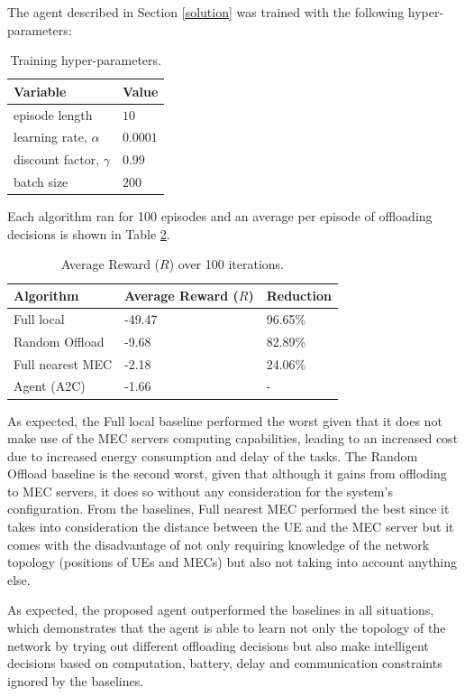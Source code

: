 The agent described in Section \ref{solution} was trained with the following hyper-parameters:

\begin{table}[H]
\centering
\begin{tabular}{|l|l|}
\hline
Variable & Value \\ \hline
episode length&$10$\\
learning rate, $\alpha$&$0.0001$\\
discount factor, $\gamma$&$0.99$\\
batch size&$200$\\ \hline
\end{tabular}
\caption{Training hyper-parameters.}\label{training_hyperparams}
\end{table}

Each algorithm ran for 100 episodes and an average per episode of offloading decisions is shown in Table \ref{resultstest1}.

\begin{table}[H]
\centering
\begin{tabular}{|l|l|l|}
\hline
Algorithm        & Average Reward ($R$) & Reduction\\ \hline
Full local       & -49.47 & 96.65\%\\
Random Offload   & -9.68 & 82.89\%\\
Full nearest MEC & -2.18 & 24.06\%\\ 
Agent (A2C) & -1.66 & -\\ \hline
\end{tabular}
\caption{Average Reward ($R$) over 100 iterations.} \label{resultstest1}
\end{table}

As expected, the Full local baseline performed the worst given that it does not make use of the \acrshort{MEC} servers computing capabilities, leading to an increased cost due to increased energy consumption and delay of the tasks. The Random Offload baseline is the second worst, given that although it gains from offloding to \acrshort{MEC} servers, it does so without any consideration for the system's configuration. From the baselines, Full nearest MEC performed the best since it takes into consideration the distance between the \acrshort{UE} and the \acrshort{MEC} server but it comes with the disadvantage of not only requiring knowledge of the network topology (positions of \acrshort{UE}s and \acrshort{MEC}s) but also not taking into account anything else. 

As expected, the proposed agent outperformed the baselines in all situations, which demonstrates that the agent is able to learn not only the topology of the network by trying out different offloading decisions but also make intelligent decisions based on computation, battery, delay and communication constraints ignored by the baselines.

